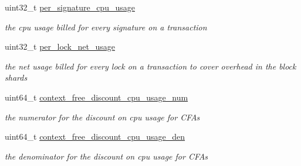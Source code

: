 \begin{DoxyCompactItemize}
\mbox{\label{structaacio_1_1chain_1_1chain__config_a27f48fa5405f1d25a49c2a782a5e3d93}} 
uint32\+\_\+t \mbox{\hyperlink{structaacio_1_1chain_1_1chain__config_a27f48fa5405f1d25a49c2a782a5e3d93}{per\+\_\+signature\+\_\+cpu\+\_\+usage}}
\begin{DoxyCompactList}\small\item\em the cpu usage billed for every signature on a transaction \end{DoxyCompactList}\item 
\mbox{\label{structaacio_1_1chain_1_1chain__config_a48c676026f8364ea1ce8fbe8675c8c50}} 
uint32\+\_\+t \mbox{\hyperlink{structaacio_1_1chain_1_1chain__config_a48c676026f8364ea1ce8fbe8675c8c50}{per\+\_\+lock\+\_\+net\+\_\+usage}}
\begin{DoxyCompactList}\small\item\em the net usage billed for every lock on a transaction to cover overhead in the block shards \end{DoxyCompactList}\item 
\mbox{\label{structaacio_1_1chain_1_1chain__config_ae1231f29fe693f5874c8acb4e5b75390}} 
uint64\+\_\+t \mbox{\hyperlink{structaacio_1_1chain_1_1chain__config_ae1231f29fe693f5874c8acb4e5b75390}{context\+\_\+free\+\_\+discount\+\_\+cpu\+\_\+usage\+\_\+num}}
\begin{DoxyCompactList}\small\item\em the numerator for the discount on cpu usage for C\+FA\textquotesingle{}s \end{DoxyCompactList}\item 
\mbox{\label{structaacio_1_1chain_1_1chain__config_a4d01561b85620fd3f5cab5e73763ebfa}} 
uint64\+\_\+t \mbox{\hyperlink{structaacio_1_1chain_1_1chain__config_a4d01561b85620fd3f5cab5e73763ebfa}{context\+\_\+free\+\_\+discount\+\_\+cpu\+\_\+usage\+\_\+den}}
\begin{DoxyCompactList}\small\item\em the denominator for the discount on cpu usage for C\+FA\textquotesingle{}s \end{DoxyCompactList}\item 
\mbox{\label{structaacio_1_1chain_1_1chain__config_a52e9b18e37056d4b345f5138a0d3cd24}} 

\end{DoxyCompactItemize}
